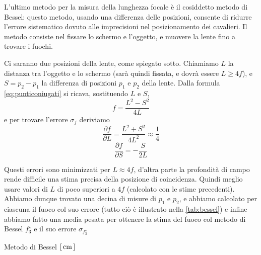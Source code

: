 L'ultimo metodo per la misura della lunghezza focale è il cosiddetto 
metodo di Bessel: questo metodo, usando una differenza delle 
posizioni, consente di ridurre l'errore sistematico dovuto alle 
imprecisioni nel posizionamento dei cavalieri. Il metodo consiste 
nel fissare lo schermo e l'oggetto, e muovere la lente fino a 
trovare i fuochi. 

Ci saranno due posizioni della lente, come spiegato sotto. Chiamiamo 
$L$ la distanza tra l'oggetto e lo schermo (sarà quindi fissata, e 
dovrà essere $L \geq 4f$), e $S=p_2-p_1$ la differenza di posizioni $p_1$ e $p_2$ della 
lente.  Dalla formula \eqref{eq:punticoniugati} si ricava, 
sostituendo $L$ e $S$,
\begin{equation}
f = \frac{L^2-S^2}{4L}
\end{equation}
e per trovare l'errore $\sigma_f$ deriviamo
\begin{equation} \label{eq:dfdl}
\frac{\partial f}{\partial L} = \frac{L^2+S^2}{4L^2} \approx \frac{1}{4}
\end{equation}
\begin{equation}
\frac{\partial f}{\partial S} = -\frac{S}{2L}
\end{equation}

Questi errori sono minimizzati per $L \approx 4f$, d'altra parte la 
profondità di campo rende difficile una stima precisa della 
posizione di coincidenza. Quindi meglio usare valori di $L$ di poco 
superiori a $4f$ (calcolato con le stime precedenti). Abbiamo dunque 
trovato una decina di misure di $p_1$ e $p_2$, e abbiamo calcolato per 
ciascuna il fuoco col suo errore (tutto ciò è illustrato nella 
\autoref{tab:bessel}) e infine abbiamo fatto una media pesata per 
ottenere la stima del fuoco col metodo di Bessel $f^{\star}_3$ e il 
suo errore $\sigma_{f^{\star}_3}$

\begin{tabella}
	\centering
	
	\caption{Metodo di Bessel $[\,\mathrm{cm}\,]$}
	\label{tab:bessel}
\end{tabella}
